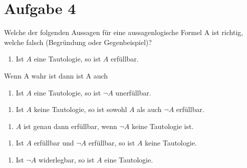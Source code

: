 \section*{Aufgabe 4}

Welche der folgenden Aussagen für eine aussagenlogische Formel A ist richtig, welche falsch (Begründung oder Gegenbeispiel)?

\begin{enumerate}[label={a)}, leftmargin=*]
\item Ist $A$ eine Tautologie, so ist $A$ erfüllbar.
\end{enumerate}

Wenn A wahr ist dann ist A auch 

\begin{enumerate}[label={b)}, leftmargin=*]
\item Ist $A$ eine Tautologie, so ist $\lnot A$ unerfüllbar.
\end{enumerate}


\begin{enumerate}[label={c)}, leftmargin=*]
\item Ist $A$ keine Tautologie, so ist sowohl $A$ als auch $\lnot A$ erfüllbar.
\end{enumerate}


\begin{enumerate}[label={d)}, leftmargin=*]
\item $A$ ist genau dann erfüllbar, wenn $\lnot A$ keine Tautologie ist.
\end{enumerate}


\begin{enumerate}[label={e)}, leftmargin=*]
\item Ist $A$ erfüllbar und $\lnot A$ erfüllbar, so ist $A$ keine Tautologie.
\end{enumerate}


\begin{enumerate}[label={f)}, leftmargin=*]
\item Ist $\lnot A$ widerlegbar, so ist $A$ eine Tautologie.
\end{enumerate}